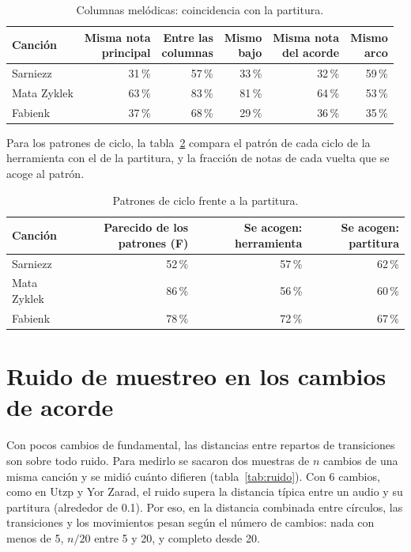 \begin{table}[ht]
  \centering\small
  \caption{Columnas melódicas: coincidencia con la partitura.}\label{tab:columnas}
  \begin{tabular}{@{}lrrrrr@{}}
    \toprule
    Canción & \shortstack{Misma nota\\principal} & \shortstack{Entre las\\columnas} & \shortstack{Mismo\\bajo} &
    \shortstack{Misma nota\\del acorde} & \shortstack{Mismo\\arco} \\
    \midrule
    Sarniezz & 31\,\% & 57\,\% & 33\,\% & 32\,\% & 59\,\% \\
    Mata Zyklek & 63\,\% & 83\,\% & 81\,\% & 64\,\% & 53\,\% \\
    Fabienk & 37\,\% & 68\,\% & 29\,\% & 36\,\% & 35\,\% \\
    \bottomrule
  \end{tabular}
\end{table}

Para los patrones de ciclo, la tabla~\ref{tab:patrones} compara el patrón de cada ciclo de la herramienta con el de la
partitura, y la fracción de notas de cada vuelta que se acoge al patrón.

\begin{table}[ht]
  \centering\small
  \caption{Patrones de ciclo frente a la partitura.}\label{tab:patrones}
  \begin{tabular}{@{}lrrr@{}}
    \toprule
    Canción & Parecido de los patrones (F) & Se acogen: herramienta & Se acogen: partitura \\
    \midrule
    Sarniezz & 52\,\% & 57\,\% & 62\,\% \\
    Mata Zyklek & 86\,\% & 56\,\% & 60\,\% \\
    Fabienk & 78\,\% & 72\,\% & 67\,\% \\
    \bottomrule
  \end{tabular}
\end{table}

\section{Ruido de muestreo en los cambios de acorde}

Con pocos cambios de fundamental, las distancias entre repartos de transiciones son sobre todo ruido. Para medirlo se
sacaron dos muestras de $n$ cambios de una misma canción y se midió cuánto difieren (tabla~\ref{tab:ruido}). Con 6
cambios, como en Utzp y Yor Zarad, el ruido supera la distancia típica entre un audio y su partitura (alrededor de 0.1).
Por eso, en la distancia combinada entre círculos, las transiciones y los movimientos pesan según el número de cambios:
nada con menos de 5, $n/20$ entre 5 y 20, y completo desde 20.


